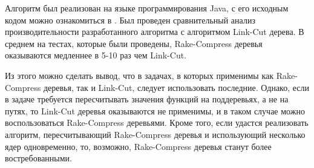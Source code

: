 Алгоритм был реализован на языке программирования Java, с его исходным кодом можно ознакомиться в \cite{github}.
Был проведен сравнительный анализ производительности разработанного алгоритма с алгоритмом Link-Cut дерева. 
В среднем на тестах, которые были проведены, Rake-Compress деревья оказываются медленнее в 5-10 раз чем Link-Cut.

Из этого можно сделать вывод, что в задачах, в которых применимы как Rake-Compress деревья, так и Link-Cut, следует использовать последние.
Однако, если в задаче требуется пересчитывать значения функций на поддеревьях, 
а не на путях, то Link-Cut деревья оказываются не применимы, и в таком случае можно воспользоваться Rake-Compress деревьями.
Кроме того, если удастся реализовать алгоритм, пересчитывающий Rake-Compress деревья и использующий несколько ядер одновременно, то, возможно, 
Rake-Compress деревья станут более востребованными.




